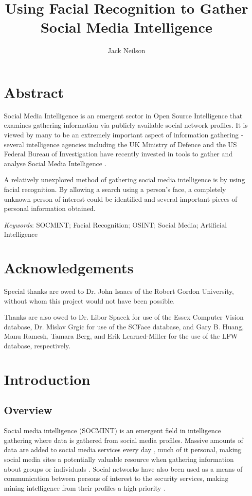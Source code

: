 \documentclass[12pt]{article}
\begin{document}
\title{Using Facial Recognition to Gather Social Media Intelligence}
\author{Jack Neilson}
\maketitle
\newpage
\tableofcontents
\newpage

\section{Abstract}
Social Media Intelligence is an emergent sector in Open Source Intelligence that examines gathering information via publicly available social network profiles. It is viewed by many to be an extremely important aspect of information gathering - several intelligence agencies including the UK Ministry of Defence and the US Federal Bureau of Investigation have recently invested in tools to gather and analyse Social Media Intelligence \citep{socmintpublicsafety}.

A relatively unexplored method of gathering social media intelligence is by using facial recognition. By allowing a search using a person's face, a completely unknown person of interest could be identified and several important pieces of personal information obtained.

\textit{Keywords}: SOCMINT; Facial Recognition; OSINT; Social Media; Artificial Intelligence

\section{Acknowledgements}
Special thanks are owed to Dr. John Isaacs of the Robert Gordon University, without whom this project would not have been possible.

Thanks are also owed to Dr. Libor Spacek for use of the Essex Computer Vision database, Dr. Mislav Grgic for use of the SCFace database, and Gary B. Huang, Manu Ramesh, Tamara Berg, and Erik Learned-Miller for the use of the LFW database, respectively.

\newpage
\section{Introduction}
\subsection{Overview}
Social media intelligence (SOCMINT) is an emergent field in intelligence gathering where data is gathered from social media profiles. Massive amounts of data are added to social media services every day \citep{socmintoverview}, much of it personal, making social media sites a potentially valuable resource when gathering information about groups or individuals \citep{gchqmasssurveillance}. Social networks have also been used as a means of communication between persons of interest to the security services, making mining intelligence from their profiles a high priority \citep{socmintoverview}\citep{policesocmint}.
\end{document}
